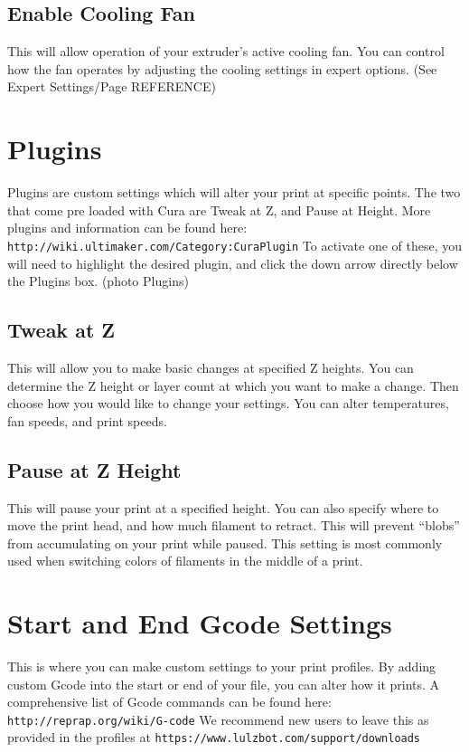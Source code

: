 \subsection{Enable Cooling Fan}

This will allow operation of your extruder's active cooling fan. You can control how the fan operates by adjusting the cooling settings in expert options. (See Expert Settings/Page REFERENCE)

\section{Plugins}

Plugins are custom settings which will alter your print at specific points. The two that come pre loaded with Cura are Tweak at Z, and Pause at Height. More plugins and information can be found here: \texttt{http://wiki.ultimaker.com/Category:CuraPlugin} To activate one of these, you will need to highlight the desired plugin, and click the down arrow directly below the Plugins box. (photo Plugins)

\subsection{Tweak at Z}

This will allow you to make basic changes at specified Z heights. You can determine the Z height or layer count at which you want to make a change. Then choose how you would like to change your settings. You can alter temperatures, fan speeds, and print speeds.

\subsection{Pause at Z Height}

This will pause your print at a specified height. You can also specify where 	to move the print head, and how much filament to retract. This will prevent “blobs” from accumulating on your print while paused. This setting is most commonly used when switching colors of filaments in the middle of a print.

\section{Start and End Gcode Settings}

This is where you can make custom settings to your print profiles. By adding custom Gcode into the start or end of your file, you can alter how it prints. A comprehensive list of Gcode commands can be found here: \texttt{http://reprap.org/wiki/G-code} We recommend new users to leave this as provided in the profiles at \texttt{https://www.lulzbot.com/support/downloads}

